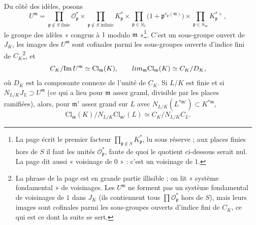 \documentclass[11pt,a4paper]{article}
\begin{document}
Du côté des idèles, posons
\[
U^{\mathfrak{m}} = \prod_{\mathfrak{p} \notin S \text{ finie}} \mathcal{O}_{\mathfrak{p}}^{*}
\times \prod_{\mathfrak{p} \notin S \text{ infinie}} K_{\mathfrak{p}}^{*}
\times \prod_{\mathfrak{p} \in S_0} \bigl(1 + \mathfrak{p}^{v_{\mathfrak{p}}(\mathfrak{m})}\bigr)
\times \prod_{\mathfrak{p} \in S_\infty} K_{\mathfrak{p}}^{*+},
\]
le groupe des idèles « congrus à $1$ modulo $\mathfrak{m}$ »\footnote{La page
écrit le premier facteur $\prod_{\mathfrak{p} \notin S} K^{*}_{\mathfrak{p}}$, lu
sous réserve ; aux places finies hors de $S$ il faut les unités
$\mathcal{O}_{\mathfrak{p}}^{*}$, faute de quoi le quotient ci-dessous serait
nul. La page dit aussi « voisinage de $0$ » : c'est un voisinage de $1$.}. C'est
un sous-groupe ouvert de $J_K$, les images des $U^{\mathfrak{m}}$ sont cofinales
parmi les sous-groupes ouverts d'indice fini de $C_K$\footnote{La phrase de la
page est en grande partie illisible ; on lit « système fondamental » de
voisinages. Les $U^{\mathfrak{m}}$ ne forment pas un système fondamental de
voisinages de $1$ dans $J_K$ (ils contiennent tous $\prod
\mathcal{O}_{\mathfrak{p}}^{*}$ hors de $S$), mais leurs images sont cofinales
parmi les sous-groupes ouverts d'indice fini de $C_K$, ce qui est ce dont la
suite se sert.}, et
\[
C_K/\mathrm{Im}\,U^{\mathfrak{m}} \simeq \mathrm{Cl}_{\mathfrak{m}}(K),
\qquad
\varprojlim_{\mathfrak{m}} \mathrm{Cl}_{\mathfrak{m}}(K) \simeq C_K/D_K,
\]
où $D_K$ est la composante connexe de l'unité de $C_K$. Si $L/K$ est finie et
si $N_{L/K} J_L \supset U^{\mathfrak{m}}$ (ce qui a lieu pour $\mathfrak{m}$
assez grand, divisible par les places ramifiées), alors, pour $\mathfrak{m}'$
assez grand sur $L$ avec $N_{L/K}(L^{*\mathfrak{m}'}) \subset K^{*\mathfrak{m}}$,
\[
\mathrm{Cl}_{\mathfrak{m}}(K)/N_{L/K}\mathrm{Cl}_{\mathfrak{m}'}(L) \simeq C_K/N_{L/K} C_L.
\]
\end{document}

